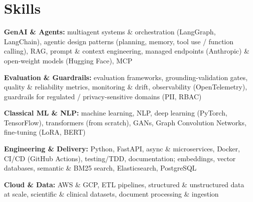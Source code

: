 \documentclass[10pt,a4paper]{article}
\begin{document}
\section{Skills}
\begin{tight}
  \item[\textcolor{accent}{\small$\bullet$}] \textbf{GenAI \& Agents:} multiagent systems \& orchestration (LangGraph, LangChain), agentic design patterns (planning, memory, tool use / function calling), RAG, prompt \& context engineering, managed endpoints (Anthropic) \& open-weight models (Hugging Face), MCP
  \item[\textcolor{accent}{\small$\bullet$}] \textbf{Evaluation \& Guardrails:} evaluation frameworks, grounding-validation gates, quality \& reliability metrics, monitoring \& drift, observability (OpenTelemetry), guardrails for regulated / privacy-sensitive domains (PII, RBAC)
  \item[\textcolor{accent}{\small$\bullet$}] \textbf{Classical ML \& NLP:} machine learning, NLP, deep learning (PyTorch, TensorFlow), transformers (from scratch), GANs, Graph Convolution Networks, fine-tuning (LoRA, BERT)
  \item[\textcolor{accent}{\small$\bullet$}] \textbf{Engineering \& Delivery:} Python, FastAPI, async \& microservices, Docker, CI/CD (GitHub Actions), testing/TDD, documentation; embeddings, vector databases, semantic \& BM25 search, Elasticsearch, PostgreSQL
  \item[\textcolor{accent}{\small$\bullet$}] \textbf{Cloud \& Data:} AWS \& GCP, ETL pipelines, structured \& unstructured data at scale, scientific \& clinical datasets, document processing \& ingestion
\end{tight}

\end{document}
